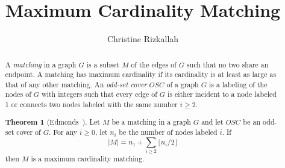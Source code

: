 \documentclass[11pt,a4paper]{article}
\theoremstyle{definition}
\newtheorem{theorem}{Theorem}
\newcommand{\OSC}{\mathit{OSC}}
\newcommand{\abs}[1]{\left\lvert #1 \right\rvert}
\begin{document}
\title{Maximum Cardinality Matching}
\author{Christine Rizkallah}
\maketitle

\begin{abstract}

A \emph{matching} in a graph $G$ is a subset $M$ of the edges of $G$ such that 
no two share an endpoint.  
A matching has maximum cardinality if its cardinality is at least as large as
that of any other matching.  
An \emph{odd-set cover} $\OSC$ of a graph $G$ is a labeling of the nodes of $G$
with integers such that every edge of $G$ is either incident to a node labeled 1 or connects two nodes labeled with the same number $i \ge 2$.

\begin{theorem}[Edmonds~\cite{Edmonds:matching}]

\label{thm-edm}
Let $M$ be a matching in a graph $G$ and let $OSC$ be an odd-set cover of $G$.
For any $i \ge 0$, let $n_i$ be the number of nodes labeled $i$. If 
$$\abs{M} = n_1 + \sum_{i\ge 2}\lfloor n_i/2 \rfloor$$
then $M$ is a maximum cardinality matching.
\end{theorem}


\end{abstract}
\end{document}

